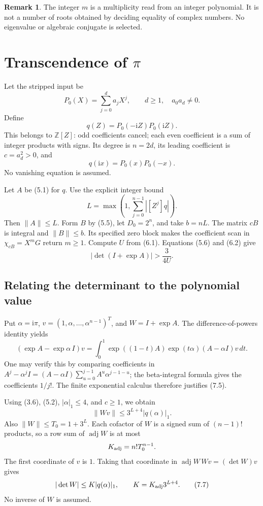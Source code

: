 \documentclass[11pt]{article}
\theoremstyle{definition}
\newtheorem{remark}[theorem]{Remark}
\newcommand{\Z}{\mathbb Z}
\newcommand{\ii}{\mathrm i}
\newcommand{\adj}{\operatorname{adj}}
\begin{document}
\begin{remark}
The integer \(m\) is a multiplicity read from an integer polynomial.
It is not a number of roots obtained by deciding equality of complex
numbers. No eigenvalue or algebraic conjugate is selected.
\end{remark}

\section{Transcendence of \texorpdfstring{\(\pi\)}{pi}}\label{sec:pi}

Let the stripped input be
\[
 P_0(X)=\sum_{j=0}^d a_jX^j,\qquad d\ge1,\quad a_0a_d\ne0.
\]
Define
\[
 q(Z)=P_0(-\ii Z)P_0(\ii Z). \tag{7.1}
\]
This belongs to \(\Z[Z]\): odd coefficients cancel; each even
coefficient is a sum of integer products with signs.
Its degree is \(n=2d\), its leading coefficient is \(c=a_d^2>0\), and
\[
 q(\ii x)=P_0(x)P_0(-x). \tag{7.2}
\]
No vanishing equation is assumed.

Let \(A\) be (5.1) for \(q\). Use the explicit integer bound
\[
 L=\max\left(1,\sum_{j=0}^{n-1}|[Z^j]q|\right). \tag{7.3}
\]
Then \(\|A\|\le L\). Form \(B\) by (5.5), let \(D_0=2^n\), and
take \(b=nL\). The matrix \(cB\) is integral and \(\|B\|\le b\).
Its specified zero block makes the coefficient scan in
\(\chi_{cB}=X^mG\) return \(m\ge1\).
Compute \(U\) from (6.1). Equations (5.6) and (6.2) give
\[
 |\det(I+\exp A)|>\frac{3}{4U}. \tag{7.4}
\]

\subsection{Relating the determinant to the polynomial value}

Put \(\alpha=\ii\pi\), \(v=(1,\alpha,\ldots,\alpha^{n-1})^T\),
and \(W=I+\exp A\). The difference-of-powers identity yields
\[
 (\exp A-\exp\alpha\,I)v
 =\int_0^1\exp((1-t)A)\exp(t\alpha)(A-\alpha I)v\,dt.
 \tag{7.5}
\]
One may verify this by comparing coefficients in
\(A^j-\alpha^jI=(A-\alpha I)\sum_{u=0}^{j-1}A^u\alpha^{j-1-u}\);
the beta-integral formula gives the coefficients \(1/j!\).
The finite exponential calculus therefore justifies (7.5).

Using (3.6), (5.2), \(|\alpha|_1\le4\), and \(c\ge1\), we obtain
\[
 \|Wv\|\le3^{L+4}|q(\alpha)|_1. \tag{7.6}
\]
Also \(\|W\|\le T_0=1+3^L\).
Each cofactor of \(W\) is a signed sum of \((n-1)!\) products,
so a row sum of \(\adj W\) is at most
\[
 K_{\rm adj}=n!T_0^{n-1}.
\]
The first coordinate of \(v\) is \(1\). Taking that coordinate in
\(\adj W\,Wv=(\det W)v\) gives
\[
 |\det W|\le K|q(\alpha)|_1,\qquad
 K=K_{\rm adj}3^{L+4}. \tag{7.7}
\]
No inverse of \(W\) is assumed.
\end{document}

